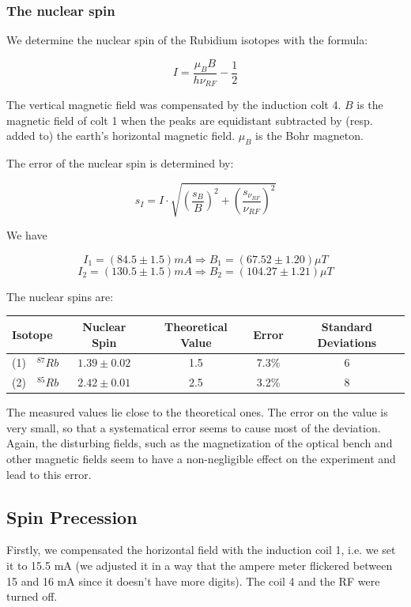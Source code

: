 \subsubsection{The nuclear spin}

We determine the nuclear spin of the Rubidium isotopes with the formula:

$$ I = \frac{\mu_BB}{h\nu_{RF}}-\frac{1}{2} $$

The vertical magnetic field was compensated by the induction colt 4. $B$ is the magnetic field of colt 1 when the peaks are equidistant subtracted by (resp. added to) the earth's horizontal magnetic field. $\mu_B$ is the Bohr magneton.

The error of the nuclear spin is determined by:

$$ s_I = I\cdot\sqrt{\left(\frac{s_B}{B}\right)^2 + \left(\frac{s_{\nu_{RF}}}{\nu_{RF}}\right)^2} $$

We have

$$I_1 = (84.5 \pm 1.5) mA \Rightarrow B_1 = (67.52 \pm 1.20)\mu T$$
$$I_2 = (130.5 \pm 1.5) mA \Rightarrow B_2 = (104.27 \pm 1.21)\mu T$$

The nuclear spins are:

\begin{center}
\begin{tabular}[H]{| l c c c c |}\hline
Isotope & Nuclear Spin & Theoretical Value & Error & Standard Deviations \\ \hline
(1)\ \ $^{87}Rb$ & $1.39 \pm 0.02$ & 1.5 & 7.3\% & 6 \\
(2)\ \ $^{85}Rb$ & $2.42 \pm 0.01$ & 2.5 & 3.2\% & 8\\  \hline
\end{tabular}
\end{center}

The measured values lie close to the theoretical ones. The error on the value is very small, so that a systematical error seems to cause most of the deviation. Again, the disturbing fields, such as the magnetization of the optical bench and other magnetic fields seem to have a non-negligible effect on the experiment and lead to this error.


\clearpage
\subsection{Spin Precession}

Firstly, we compensated the horizontal field with the induction coil 1, i.e. we set it to 15.5 mA (we adjusted it in a way that the ampere meter flickered between 15 and 16 mA since it doesn't have more digits). The coil 4 and the RF were turned off.

